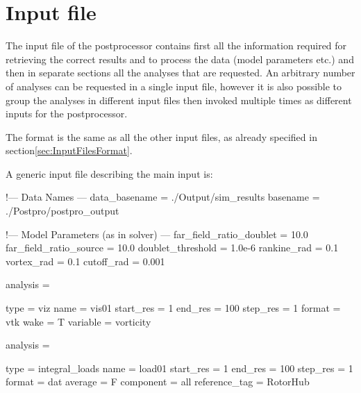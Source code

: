 \section{Input file}
\label{sec:Post_InputFile}

The input file of the postprocessor contains first all the information 
required for retrieving the correct results and to process the data 
(model parameters etc.) and then in separate sections all the analyses 
that are requested. An arbitrary number of analyses can be requested in 
a single input file, however it is also possible to group the analyses 
in different input files then invoked multiple times as different inputs 
for the postprocessor. 

The format is the same as all the other input files, as already specified 
in section\ref{sec:InputFilesFormat}.

A generic input file describing the main input is:

\begin{inputfile}[frame=single, caption={dust\_post.in}, label={file:dust_post.in}]
!--- Data Names ---
data_basename = ./Output/sim_results
basename =     ./Postpro/postpro_output

!--- Model Parameters (as in solver) ---
far_field_ratio_doublet = 10.0
far_field_ratio_source = 10.0
doublet_threshold = 1.0e-6
rankine_rad = 0.1
vortex_rad = 0.1
cutoff_rad = 0.001

analysis = {

type = viz  
name = vis01
start_res = 1
end_res   = 100 
step_res  = 1
format = vtk
wake = T
variable = vorticity 
}

analysis = {

type = integral_loads
name = load01
start_res = 1
end_res   = 100 
step_res  = 1
format = dat
average = F
component = all
reference_tag = RotorHub
}

\end{inputfile}

